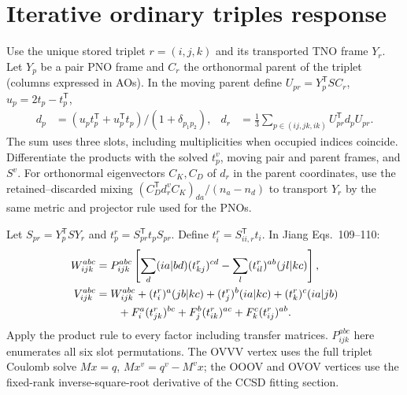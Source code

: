 \documentclass[11pt]{article}
\begin{document}
\section{Iterative ordinary triples response}
Use the unique stored triplet $r=(i,j,k)$ and its transported TNO frame
$Y_r$. Let $Y_p$ be a pair PNO frame and $C_r$ the orthonormal parent of the
triplet (columns expressed in AOs). In the moving parent define
$U_{pr}=Y_p^{\mathsf T} S C_r$, $u_p=2t_p-t_p^{\mathsf T}$,
\begin{align}
 d_p&=(u_p t_p^{\mathsf T}+u_p^{\mathsf T}t_p)/(1+\delta_{p_1p_2}),&
 d_r&=\tfrac13\sum_{p\in(ij,jk,ik)}U_{pr}^{\mathsf T}d_p U_{pr}.
\end{align}
The sum uses three slots, including multiplicities when occupied indices
coincide. Differentiate the products with the solved $t_p^v$, moving pair
and parent frames, and $S^v$. For orthonormal eigenvectors $C_K,C_D$ of
$d_r$ in the parent coordinates, use the retained--discarded mixing
$(C_D^{\mathsf T}d_r^v C_K)_{da}/(n_a-n_d)$ to transport $Y_r$ by the
same metric and projector rule used for the PNOs.

Let $S_{pr}=Y_p^{\mathsf T}SY_r$ and $t_p^r=S_{pr}^{\mathsf T}t_pS_{pr}$.
Define $t_i^r=S_{ii,r}^{\mathsf T}t_i$. In Jiang Eqs.~109--110:
\begin{align}
 W_{ijk}^{abc}&=P_{ijk}^{abc}\left[\sum_d(ia|bd)(t_{kj}^r)^{cd}
                         -\sum_l(t_{il}^r)^{ab}(jl|kc)\right],\\
 V_{ijk}^{abc}&=W_{ijk}^{abc}
 +(t_i^r)^a(jb|kc)+(t_j^r)^b(ia|kc)+(t_k^r)^c(ia|jb)\notag\\
 &\qquad +F_i^a(t_{jk}^r)^{bc}+F_j^b(t_{ik}^r)^{ac}+F_k^c(t_{ij}^r)^{ab}.
\end{align}
Apply the product rule to every factor including transfer matrices. $P_{ijk}^{abc}$
here enumerates all six slot permutations. The OVVV vertex uses the full
triplet Coulomb solve $Mx=q$, $Mx^v=q^v-M^vx$; the OOOV and OVOV vertices
use the fixed-rank inverse-square-root derivative of the CCSD fitting section.
\end{document}
